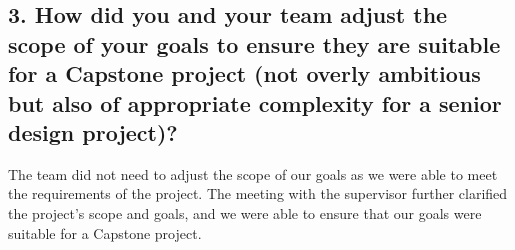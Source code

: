 \documentclass{article}
\begin{document}
\subsection*{3. How did you and your team adjust the scope of your goals to ensure they are suitable for a Capstone project (not overly ambitious but also of appropriate complexity for a senior design project)?}
The team did not need to adjust the scope of our goals as we were able to meet the requirements of the project. The meeting with the supervisor further clarified the project's scope and goals, and we were able to ensure that our goals were suitable for a Capstone project.
\end{document}
